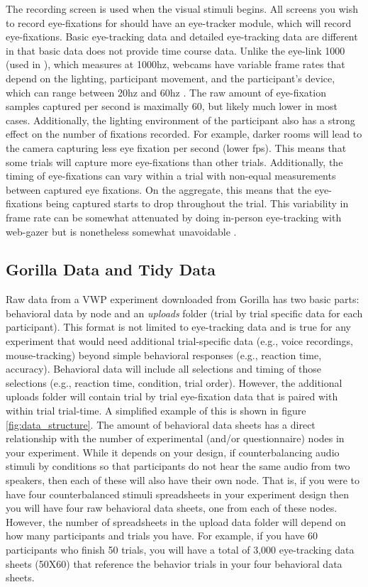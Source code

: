 The recording screen is used when the visual stimuli begins. All screens you wish to record eye-fixations for should have an eye-tracker module, which will record eye-fixations. Basic eye-tracking data and detailed eye-tracking data are different in that basic data does not provide time course data. Unlike the eye-link 1000 (used in \parencite{Porretta_et_al_2020}), which measures at 1000hz, webcams have variable frame rates that depend on the lighting, participant movement, and the participant's device, which can range between 20hz and 60hz \parencite{Vos_2017}. The raw amount of eye-fixation samples captured per second is maximally 60, but likely much lower in most cases. Additionally, the lighting environment of the participant also has a strong effect on the number of fixations recorded. For example, darker rooms will lead to the camera capturing less eye fixation per second (lower fps). This means that some trials will capture more eye-fixations than other trials. \parencite{} Additionally, the timing of eye-fixations can vary within a trial with non-equal measurements between captured eye fixations. On the aggregate, this means that the eye-fixations being captured starts to drop throughout the trial. This variability in frame rate can be somewhat attenuated by doing in-person eye-tracking with web-gazer but is nonetheless somewhat unavoidable \parencite[e.g.,][]{}{}{}. 

\subsection{Gorilla Data and Tidy Data}

Raw data from a VWP experiment downloaded from Gorilla has two basic parts: behavioral data by node and an \textit{uploads} folder (trial by trial specific data for each participant). This format is not limited to eye-tracking data and is true for any experiment that would need additional trial-specific data (e.g., voice recordings, mouse-tracking) beyond simple behavioral responses (e.g., reaction time, accuracy). Behavioral data will include all selections and timing of those selections (e.g., reaction time, condition, trial order). However, the additional uploads folder will contain trial by trial eye-fixation data that is paired with within trial trial-time. A simplified example of this is shown in figure \ref{fig:data_structure}. The amount of behavioral data sheets has a direct relationship with the number of experimental (and/or questionnaire) nodes in your experiment. While it depends on your design, if counterbalancing audio stimuli by conditions so that participants do not hear the same audio from two speakers, then each of these will also have their own node. That is, if you were to have four counterbalanced stimuli spreadsheets in your experiment design then you will have four raw behavioral data sheets, one from each of these nodes. However, the number of spreadsheets in the upload data folder will depend on how many participants and trials you have. For example, if you have 60 participants who finish 50 trials, you will have a total of 3,000 eye-tracking data sheets (50X60) that reference the behavior trials in your four behavioral data sheets.

